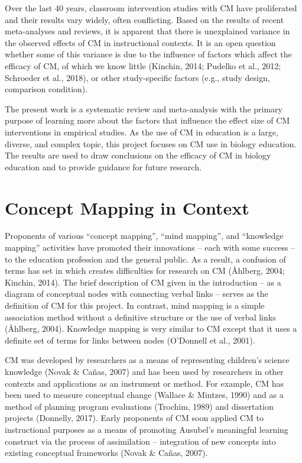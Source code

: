 \documentclass[
  letterpaper,
  DIV=11,
  numbers=noendperiod]{scrartcl}
\begin{document}
Over the last 40 years, classroom intervention studies with CM have
proliferated and their results vary widely, often conflicting. Based on
the results of recent meta-analyses and reviews, it is apparent that
there is unexplained variance in the observed effects of CM in
instructional contexts. It is an open question whether some of this
variance is due to the influence of factors which affect the efficacy of
CM, of which we know little (Kinchin, 2014; Pudelko et al., 2012;
Schroeder et al., 2018), or other study-specific factors (e.g., study
design, comparison condition).

The present work is a systematic review and meta-analysis with the
primary purpose of learning more about the factors that influence the
effect size of CM interventions in empirical studies. As the use of CM
in education is a large, diverse, and complex topic, this project
focuses on CM use in biology education. The results are used to draw
conclusions on the efficacy of CM in biology education and to provide
guidance for future research.

\hypertarget{concept-mapping-in-context}{%
\section{Concept Mapping in Context}\label{concept-mapping-in-context}}

Proponents of various ``concept mapping'', ``mind mapping'', and
``knowledge mapping'' activities have promoted their innovations -- each
with some success -- to the education profession and the general public.
As a result, a confusion of terms has set in which creates difficulties
for research on CM (Åhlberg, 2004; Kinchin, 2014). The brief description
of CM given in the introduction -- as a diagram of conceptual nodes with
connecting verbal links -- serves as the definition of CM for this
project. In contrast, mind mapping is a simple association method
without a definitive structure or the use of verbal links (Åhlberg,
2004). Knowledge mapping is very similar to CM except that it uses a
definite set of terms for links between nodes (O'Donnell et al., 2001).

CM was developed by researchers as a means of representing children's
science knowledge (Novak \& Cañas, 2007) and has been used by
researchers in other contexts and applications as an instrument or
method. For example, CM has been used to measure conceptual change
(Wallace \& Mintzes, 1990) and as a method of planning program
evaluations (Trochim, 1989) and dissertation projects (Donnelly, 2017).
Early proponents of CM soon applied CM to instructional purposes as a
means of promoting Ausubel's meaningful learning construct via the
process of assimilation -- integration of new concepts into existing
conceptual frameworks (Novak \& Cañas, 2007).
\end{document}
